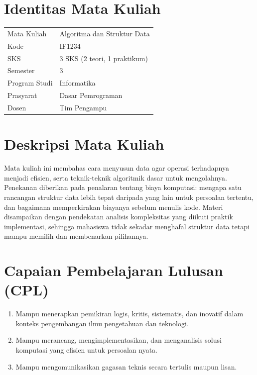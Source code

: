 %

\section*{Identitas Mata Kuliah}

\begin{tabular}{ll}
Mata Kuliah   & Algoritma dan Struktur Data \\
Kode          & IF1234 \\
SKS           & 3 SKS (2 teori, 1 praktikum) \\
Semester      & 3 \\
Program Studi & Informatika \\
Prasyarat     & Dasar Pemrograman \\
Dosen         & Tim Pengampu \\
\end{tabular}

\section*{Deskripsi Mata Kuliah}

Mata kuliah ini membahas cara menyusun data agar operasi terhadapnya menjadi
efisien, serta teknik-teknik algoritmik dasar untuk mengolahnya. Penekanan
diberikan pada penalaran tentang biaya komputasi: mengapa satu rancangan
struktur data lebih tepat daripada yang lain untuk persoalan tertentu, dan
bagaimana memperkirakan biayanya sebelum menulis kode. Materi disampaikan
dengan pendekatan analisis kompleksitas yang diikuti praktik implementasi,
sehingga mahasiswa tidak sekadar menghafal struktur data tetapi mampu memilih
dan membenarkan pilihannya.

\section*{Capaian Pembelajaran Lulusan (CPL)}

\begin{enumerate}
  \item Mampu menerapkan pemikiran logis, kritis, sistematis, dan inovatif
        dalam konteks pengembangan ilmu pengetahuan dan teknologi.
  \item Mampu merancang, mengimplementasikan, dan menganalisis solusi
        komputasi yang efisien untuk persoalan nyata.
  \item Mampu mengomunikasikan gagasan teknis secara tertulis maupun lisan.
\end{enumerate}

